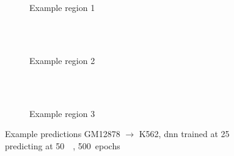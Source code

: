 \begin{figure}[p] %
    \begin{subfigure}{\textwidth}
        \centering
        \caption{Example  region 1} \label{fig:results:50k_from25k_r1}
    \end{subfigure}\\[2mm]
    \\[3mm]
    \begin{subfigure}{\textwidth}
        \centering
        \caption{Example region 2} \label{fig:results:50k_from25k_r2}
    \end{subfigure}\\[2mm]
    \\[3mm]
    \begin{subfigure}{\textwidth}
        \centering
        \caption{Example region 3} \label{fig:results:50k_from25k_r3}
    \end{subfigure}
    \caption{Example predictions GM12878 $\rightarrow$ K562,  \acrshort{dnn} trained at \SI{25}{\kilo\bp} predicting at \SI{50}{\kilo\bp}, 500~epochs} \label{fig:results:50k_from25k_matrices}
\end{figure}
